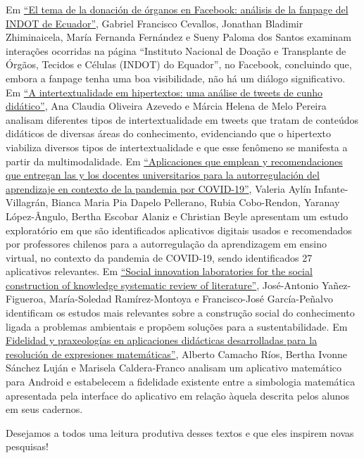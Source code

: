 \documentclass{textolivre}
\begin{document}
Em \href{https://doi.org/10.35699/1983-3652.2021.29687}{“El tema de la donación de órganos en Facebook: análisis de la fanpage del INDOT de Ecuador”}, Gabriel Francisco Cevallos, Jonathan Bladimir Zhiminaicela, María Fernanda Fernández e Sueny Paloma dos Santos examinam interações ocorridas na página “Instituto Nacional de Doação e Transplante de Órgãos, Tecidos e Células (INDOT) do Equador”, no Facebook, concluindo que, embora a fanpage tenha uma boa visibilidade, não há um diálogo significativo. Em \href{https://doi.org/10.35699/1983-3652.2021.32557}{“A intertextualidade em hipertextos: uma análise de tweets de cunho didático”}, Ana Claudia Oliveira Azevedo e Márcia Helena de Melo Pereira analisam diferentes tipos de intertextualidade em tweets que tratam de conteúdos didáticos de diversas áreas do conhecimento, evidenciando que o hipertexto viabiliza diversos tipos de intertextualidade e que esse fenômeno se manifesta a partir da multimodalidade. Em \href{https://doi.org/10.35699/1983-3652.2021.33027}{“Aplicaciones que emplean y recomendaciones que entregan las y los docentes universitarios para la autorregulación del aprendizaje en contexto de la pandemia por COVID-19”}, Valeria Aylín Infante-Villagrán, Bianca Maria Pia Dapelo Pellerano, Rubia Cobo-Rendon, Yaranay López-Ângulo, Bertha Escobar Alaniz e Christian Beyle apresentam um estudo exploratório em que são identificados aplicativos digitais usados e recomendados por professores chilenos para a autorregulação da aprendizagem em ensino virtual, no contexto da pandemia de COVID-19, sendo identificados 27 aplicativos relevantes. Em \href{https://doi.org/10.35699/1983-3652.2021.33750}{“Social innovation laboratories for the social construction of knowledge systematic review of literature”}, José-Antonio Yañez-Figueroa, María-Soledad Ramírez-Montoya e Francisco-José García-Peñalvo identificam os estudos mais relevantes sobre a construção social do conhecimento ligada a problemas ambientais e propõem soluções para a sustentabilidade. Em \href{https://doi.org/10.35699/1983-3652.2021.35052}{Fidelidad y praxeologías en aplicaciones didácticas desarrolladas para la resolución de expresiones matemáticas”}, Alberto Camacho Ríos, Bertha Ivonne Sánchez Luján e Marisela Caldera-Franco analisam um aplicativo matemático para Android e estabelecem a fidelidade existente entre a simbologia matemática apresentada pela interface do aplicativo em relação àquela descrita pelos alunos em seus cadernos. 

Desejamos a todos uma leitura produtiva desses textos e que eles inspirem novas pesquisas! 
\end{document}
